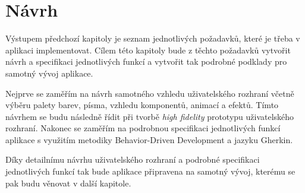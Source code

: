 \chapter{Návrh}

Výstupem předchozí kapitoly je seznam jednotlivých požadavků, které je třeba v aplikaci implementovat. Cílem této kapitoly bude z těchto požadavků vytvořit návrh a specifikaci jednotlivých funkcí a vytvořit tak podrobné podklady pro samotný vývoj aplikace.

Nejprve se zaměřím na návrh samotného vzhledu uživatelského rozhraní včetně výběru palety barev, písma, vzhledu komponentů, animací a efektů. Tímto návrhem se budu následně řídit při tvorbě \textit{high fidelity} prototypu uživatelského rozhraní. Nakonec se zaměřím na podrobnou specifikaci jednotlivých funkcí aplikace s využitím metodiky Behavior-Driven Development a jazyku Gherkin. %

Díky detailnímu návrhu uživatelského rozhraní a podrobné specifikaci jednotlivých funkcí tak bude aplikace připravena na samotný vývoj, kterému se pak budu věnovat v další kapitole.
